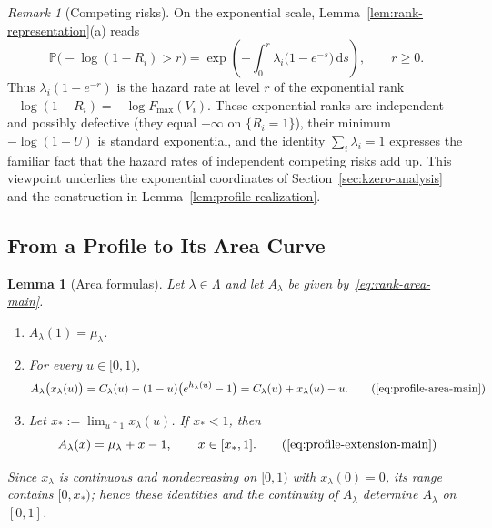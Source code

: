 \documentclass[11pt]{article}
\newtheorem{lemma}[theorem]{Lemma}
\theoremstyle{definition}
\theoremstyle{remark}
\newtheorem*{remark}{Remark}
\newcommand{\Pp}{\mathbb P}
\newcommand{\dd}{\,\mathrm d}
\begin{document}
\begin{remark}[Competing risks]
On the exponential scale, Lemma~\ref{lem:rank-representation}(a) reads
\[
 \Pp\bigl(-\log(1-R_i)>r\bigr)=\exp\!\left(-\int_0^r\lambda_i\bigl(1-e^{-s}\bigr)\dd s\right),
 \qquad r\ge0.
\]
Thus $\lambda_i(1-e^{-r})$ is the hazard rate at level $r$ of the exponential rank $-\log(1-R_i)=-\log F_{\max}(V_i)$.
These exponential ranks are independent and possibly defective (they equal $+\infty$ on $\{R_i=1\}$), their minimum $-\log(1-U)$ is standard exponential, and the identity $\sum_i\lambda_i=1$ expresses the familiar fact that the hazard rates of independent competing risks add up.
This viewpoint underlies the exponential coordinates of Section~\ref{sec:kzero-analysis} and the construction in Lemma~\ref{lem:profile-realization}.
\end{remark}

\subsection{From a Profile to Its Area Curve}

\begin{lemma}[Area formulas]\label{lem:profile-area}
Let $\lambda\in\Lambda$ and let $A_\lambda$ be given by~\eqref{eq:rank-area-main}.
\begin{enumerate}
\item[(a)] $A_\lambda(1)=\mu_\lambda$.
\item[(b)] For every $u\in[0,1)$,
\begin{equation*}
 A_\lambda\bigl(x_\lambda(u)\bigr)
 =C_\lambda(u)-(1-u)\bigl(e^{h_\lambda(u)}-1\bigr)
 =C_\lambda(u)+x_\lambda(u)-u.
 \tag{\ref*{eq:profile-area-main}}
\end{equation*}
\item[(c)] Let $x_*:=\lim_{u\uparrow1}x_\lambda(u)$.
If $x_*<1$, then
\begin{equation*}
 A_\lambda(x)=\mu_\lambda+x-1,
 \qquad x\in[x_*,1].
 \tag{\ref*{eq:profile-extension-main}}
\end{equation*}
\end{enumerate}
Since $x_\lambda$ is continuous and nondecreasing on $[0,1)$ with $x_\lambda(0)=0$, its range contains $[0,x_*)$; hence these identities and the continuity of $A_\lambda$ determine $A_\lambda$ on $[0,1]$.
\end{lemma}
\end{document}
